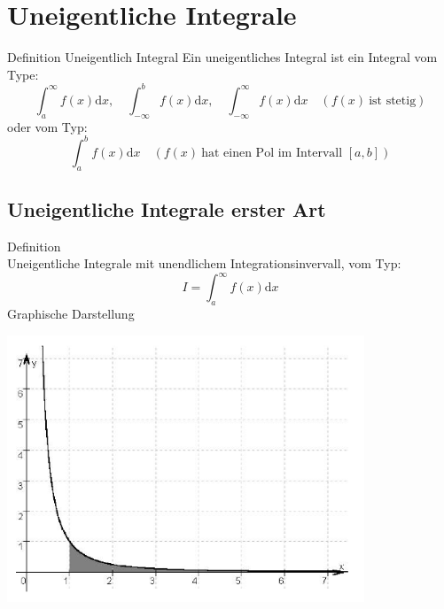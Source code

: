 \section{Uneigentliche Integrale}
\begin{definition}{Definition Uneigentlich Integral}
	Ein uneigentliches Integral ist ein Integral vom Type:
	\[\int_a^\infty{f(x)\mathrm{d}x}, \quad \int_{-\infty}^b{f(x)\mathrm{d}x}, \quad
	\int_{-\infty}^{\infty}{f(x)\mathrm{d}x} \quad (f(x) \: \text{ist stetig}) \]
	oder vom Typ:
	\[\int_a^b{f(x)\mathrm{d}x} \quad (f(x)\:\text{hat einen Pol im Intervall }[a,b]) \]
\end{definition}
\subsection{Uneigentliche Integrale erster Art}
\begin{definition}{Definition}\\
	Uneigentliche Integrale mit unendlichem Integrationsinvervall, vom Typ:
	\[I=\int_a^{\infty}{f(x)\mathrm{d}x} \]
Graphische Darstellung
  \begin{centering}
	  \includegraphics[width=0.8\textwidth]{images/Uneigentlicher_Integral_Beispiel1.png}\\
  \end{centering}
\end{definition}
